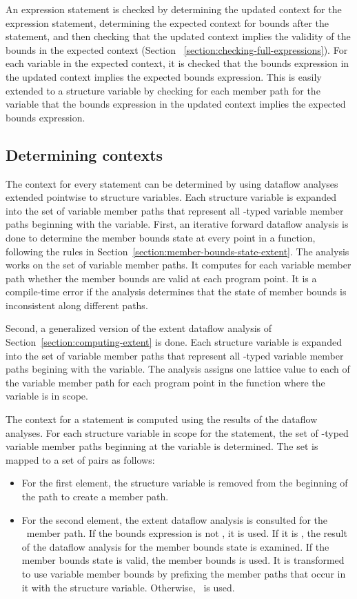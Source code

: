 An expression statement is checked by determining the updated context for the
expression statement, determining the expected context for bounds after 
the statement, and then checking that the updated context implies the
validity of the bounds in the expected context (Section ~\ref{section:checking-full-expressions}).
For each variable in the expected context, it is checked that the bounds expression in
the updated context implies the expected bounds expression.  This is easily 
extended to a structure variable by checking for each member path for 
the variable that the bounds expression in the updated context implies
the expected bounds expression.

\subsection{Determining contexts}

The context for every statement can be determined by using dataflow analyses extended
pointwise to structure variables.  Each structure variable is expanded into the set
of variable member paths that represent all \arrayptr-typed variable member paths beginning
with the variable.  First, an iterative forward dataflow analysis is done to determine the
member bounds state at every point in a function, following the rules in
Section~\ref{section:member-bounds-state-extent}.  The analysis works on the set of variable
member paths.   It computes for each variable member path whether the member bounds are valid 
at each program point.  It is a compile-time error if the analysis determines that the state of
member bounds is inconsistent along different paths.

Second, a generalized version of the extent dataflow analysis of Section~\ref{section:computing-extent}
is done.  Each structure variable is expanded into the set of variable
member paths that represent all \arrayptr-typed variable member paths begining with 
the variable.  The analysis assigns one lattice value to each of the variable member path for
each program point in the function where the variable is in scope.

The context for a statement is computed using the results of the dataflow analyses.
For each structure variable in scope for the statement, the set of \arrayptr-typed variable member paths 
beginning at the variable is determined.  The set is mapped to a set of pairs as follows:
\begin{itemize}
\item For the first element, the structure variable is removed from the beginning of the
path to create a member path.
\item For the second element, the extent dataflow analysis is consulted for the \arrayptr\ member path.
   If the bounds expression is not \boundsunknown, it is used.   If it is \boundsunknown, the result
   of the dataflow analysis for the member bounds state is examined. If the member bounds
   state is valid, the member bounds is used.  It is transformed to use variable member
   bounds by prefixing the member paths that occur in it with the structure variable.
   Otherwise, \boundsunknown\ is used.
\end{itemize}

